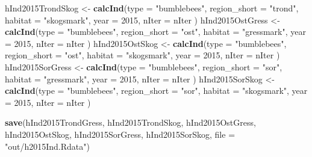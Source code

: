 \documentclass[]{article}
\newenvironment{Shaded}{\begin{snugshade}}{\end{snugshade}}
\newcommand{\KeywordTok}[1]{\textcolor[rgb]{0.13,0.29,0.53}{\textbf{#1}}}
\newcommand{\DataTypeTok}[1]{\textcolor[rgb]{0.13,0.29,0.53}{#1}}
\newcommand{\DecValTok}[1]{\textcolor[rgb]{0.00,0.00,0.81}{#1}}
\newcommand{\StringTok}[1]{\textcolor[rgb]{0.31,0.60,0.02}{#1}}
\newcommand{\NormalTok}[1]{#1}
\begin{document}
\begin{Shaded}
\begin{Highlighting}[]
\NormalTok{hInd2015TrondSkog <-}\StringTok{ }\KeywordTok{calcInd}\NormalTok{(}\DataTypeTok{type =} \StringTok{"bumblebees"}\NormalTok{,}
                              \DataTypeTok{region_short =} \StringTok{"trond"}\NormalTok{,}
                              \DataTypeTok{habitat =} \StringTok{"skogsmark"}\NormalTok{,}
                              \DataTypeTok{year =} \DecValTok{2015}\NormalTok{,}
                              \DataTypeTok{nIter =}\NormalTok{ nIter}
\NormalTok{                              )}
\NormalTok{hInd2015OstGress <-}\StringTok{ }\KeywordTok{calcInd}\NormalTok{(}\DataTypeTok{type =} \StringTok{"bumblebees"}\NormalTok{,}
                              \DataTypeTok{region_short =} \StringTok{"ost"}\NormalTok{,}
                              \DataTypeTok{habitat =} \StringTok{"gressmark"}\NormalTok{,}
                              \DataTypeTok{year =} \DecValTok{2015}\NormalTok{,}
                              \DataTypeTok{nIter =}\NormalTok{ nIter}
\NormalTok{                              )}
\NormalTok{hInd2015OstSkog <-}\StringTok{ }\KeywordTok{calcInd}\NormalTok{(}\DataTypeTok{type =} \StringTok{"bumblebees"}\NormalTok{,}
                              \DataTypeTok{region_short =} \StringTok{"ost"}\NormalTok{,}
                              \DataTypeTok{habitat =} \StringTok{"skogsmark"}\NormalTok{,}
                              \DataTypeTok{year =} \DecValTok{2015}\NormalTok{,}
                              \DataTypeTok{nIter =}\NormalTok{ nIter}
\NormalTok{                              )}
\NormalTok{hInd2015SorGress <-}\StringTok{ }\KeywordTok{calcInd}\NormalTok{(}\DataTypeTok{type =} \StringTok{"bumblebees"}\NormalTok{,}
                              \DataTypeTok{region_short =} \StringTok{"sor"}\NormalTok{,}
                              \DataTypeTok{habitat =} \StringTok{"gressmark"}\NormalTok{,}
                              \DataTypeTok{year =} \DecValTok{2015}\NormalTok{,}
                              \DataTypeTok{nIter =}\NormalTok{ nIter}
\NormalTok{                              )}
\NormalTok{hInd2015SorSkog <-}\StringTok{ }\KeywordTok{calcInd}\NormalTok{(}\DataTypeTok{type =} \StringTok{"bumblebees"}\NormalTok{,}
                              \DataTypeTok{region_short =} \StringTok{"sor"}\NormalTok{,}
                              \DataTypeTok{habitat =} \StringTok{"skogsmark"}\NormalTok{,}
                              \DataTypeTok{year =} \DecValTok{2015}\NormalTok{,}
                              \DataTypeTok{nIter =}\NormalTok{ nIter}
\NormalTok{                              )}

\KeywordTok{save}\NormalTok{(hInd2015TrondGress, hInd2015TrondSkog, hInd2015OstGress, hInd2015OstSkog, hInd2015SorGress, hInd2015SorSkog, }\DataTypeTok{file =} \StringTok{"out/h2015Ind.Rdata"}\NormalTok{)}
\end{Highlighting}
\end{Shaded}
\end{document}
